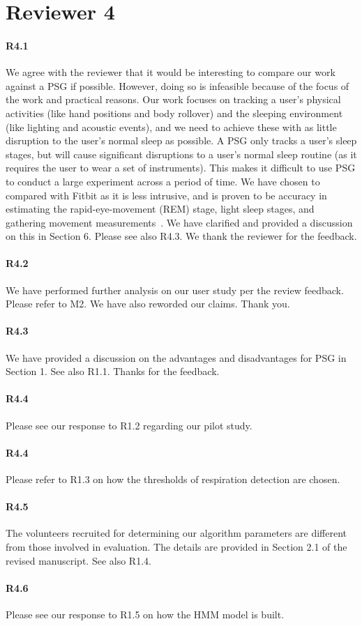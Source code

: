 \section*{Reviewer 4}

\paragraph{R4.1} We agree with the reviewer that it would be interesting to compare our work against a PSG if possible. However, doing so
is infeasible because of the focus of the work and practical reasons. Our work focuses on tracking a user's physical activities (like hand
positions and body rollover) and the sleeping environment (like lighting and acoustic events), and we need to achieve these with as little
disruption to the user's normal sleep as possible. A PSG only tracks a user's sleep stages, but will cause significant disruptions to a
user's normal sleep routine (as it requires the user to wear a set of instruments). This makes it difficult to use PSG to conduct a large
experiment across a period of time. We have chosen to compared with Fitbit as it is less intrusive, and is proven to be accuracy in
estimating the rapid-eye-movement (REM) stage, light sleep stages, and gathering movement measurements~\cite{fitbit01,fitbit02,fitbit03}.
We have clarified and provided a discussion on this in Section 6. Please see also R4.3. We thank the reviewer for the feedback.

\paragraph{R4.2} We have performed further analysis on our user study per the review feedback. Please refer to M2. We have also reworded our
claims. Thank you.


\paragraph{R4.3} We have provided a discussion on the advantages and disadvantages for PSG in Section 1. See also R1.1. Thanks for the feedback.

\paragraph{R4.4} Please see our response to R1.2 regarding our pilot study.

\paragraph{R4.4} Please refer to R1.3 on how the thresholds of respiration detection are chosen.

\paragraph{R4.5} The volunteers recruited for determining our algorithm parameters are different from those involved in
 evaluation. The details are provided in Section 2.1 of the revised manuscript. See also R1.4.

 \paragraph{R4.6} Please see our response to R1.5 on how the HMM model is built.
